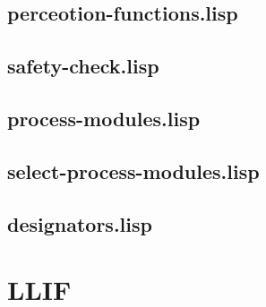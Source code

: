 \documentclass[main.tex]{subfiles}
\begin{document}
	    \subsection{perceotion-functions.lisp}
	    \subsection{safety-check.lisp}
	    \subsection{process-modules.lisp}
	    \subsection{select-process-modules.lisp}
	    \subsection{designators.lisp}

	  	\section{LLIF}

	\endgroup
\end{document}
